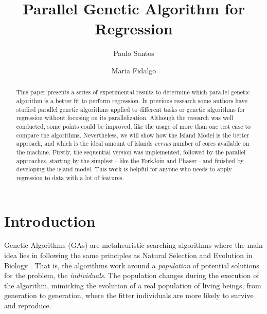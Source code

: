 \documentclass[runningheads]{llncs}
\begin{document}
\title{Parallel Genetic Algorithm for Regression}

\author{Paulo Santos \and
Maria Fidalgo
}


\maketitle

\begin{abstract}
This paper presents a series of experimental results to determine which parallel genetic algorithm is a better fit to perform regression. In previous research some authors have studied parallel genetic algorithms applied to different tasks or genetic algorithms for regression without focusing on its parallelization. Although the research was well conducted, some points could be improved, like the usage of more than one test case to compare the algorithms. Nevertheless, we will show how the Island Model is the better approach, and which is the ideal amount of islands \textit{versus} number of cores available on the machine. Firstly, the sequential version was implemented, followed by the parallel approaches, starting by the simplest - like the ForkJoin and Phaser - and finished by developing the island model. This work is helpful for anyone who needs to apply regression to data with a lot of features.

\end{abstract}


\section{Introduction}

Genetic Algorithms (GAs) are metaheuristic searching algorithms where the main idea lies in following the same principles as Natural Selection and Evolution in Biology \cite{sivanandam2008genetic}. That is, the algorithms work around a \textit{population} of potential solutions for the problem, the \textit{individuals}. The population changes during the execution of the algorithm, mimicking the evolution of a real population of living beings, from generation to generation, where the fitter individuals are more likely to survive and reproduce.
\end{document}
